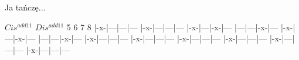 \documentclass[../../../songbook.tex]{subfiles}
\begin{document}
\-\hspace{1cm} Ja tańczę...			\newline

$Cis^{add11}$ 		\tab  $Dis^{add11}$ 	   5   6 		   7   8 		\newline
|-x-|---|---|--- 	\tab 	|-x-|---|---|--- 	\newline
|-x-|---|-x-|--- 	\tab 	|---|---|-x-|--- 	\newline
|-x-|---|-x-|--- 	\tab 	|---|---|-x-|--- 	\newline
|-x-|---|---|--- 	\tab 	|-x-|---|---|--- 	\newline
|-x-|---|---|--- 	\tab 	|-x-|---|---|--- 	\newline
|-x-|---|---|---	\tab 	|-x-|---|---|--- 	\newline
\end{document}
